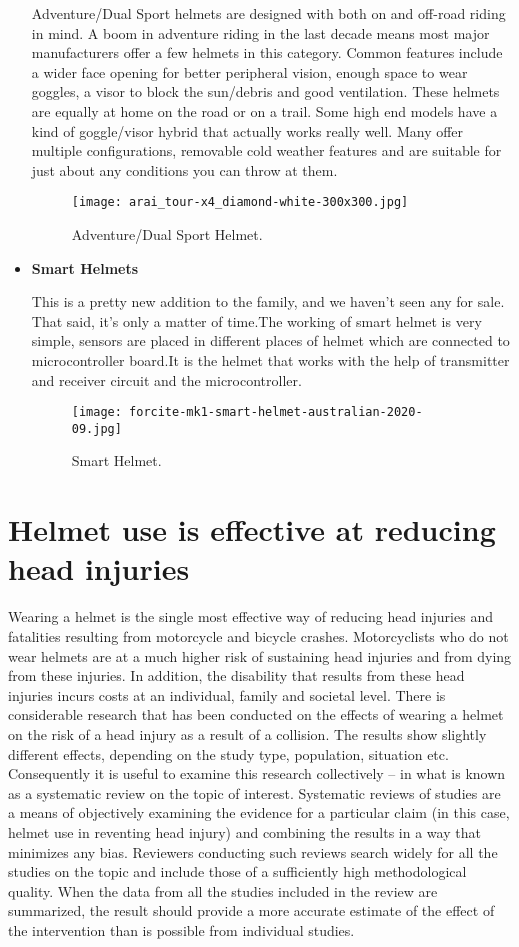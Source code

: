 \begin{itemize}
	Adventure/Dual Sport helmets are designed with both on and off-road riding in mind. A boom in adventure riding in the last decade means most major manufacturers offer a few helmets in this category. Common features include a wider face opening for better peripheral vision, enough space to wear goggles, a visor to block the sun/debris and good ventilation. These helmets are equally at home on the road or on a trail. Some high end models have a kind of goggle/visor hybrid that actually works really well. Many offer multiple configurations, removable cold weather features and are suitable for just about any conditions you can throw at them.
	\begin{figure}[h]
		\centering
		\texttt{[image: arai\_tour-x4\_diamond-white-300x300.jpg]}
		\caption{Adventure/Dual Sport Helmet.}
	\end{figure}
	
	\item\textbf{Smart Helmets} \vspace{.1cm}
	
	This is a pretty new addition to the family, and we haven’t seen any for sale. That said, it’s only a matter of time.The working of smart helmet is very simple, sensors are placed in different places of helmet which are connected to microcontroller board.It is the helmet that works with the help of transmitter and receiver circuit and the microcontroller.
	
	\begin{figure}[h]
		\centering
		\texttt{[image: forcite-mk1-smart-helmet-australian-2020-09.jpg]}
		\caption{Smart Helmet.}
	\end{figure}
\end{itemize} 
\section{Helmet use is effective at reducing head injuries}
Wearing a helmet is the single most effective way of reducing head injuries and fatalities resulting from motorcycle and bicycle crashes. Motorcyclists who do not wear helmets are at a much higher risk of sustaining head injuries and from dying from these injuries. In addition, the disability that results from these head
injuries incurs costs at an individual, family and societal level. There is considerable research that has been conducted on the effects of wearing a helmet on the risk of a head injury as a result of a collision. The results show slightly different effects, depending on the study type, population, situation etc. Consequently it is useful to examine this research collectively – in what is known as a systematic review on the topic of interest. Systematic reviews of studies are a means of objectively examining the evidence for a particular claim (in this case, helmet use in reventing head injury) and combining the results in a way that minimizes any bias. Reviewers conducting such reviews search widely for all the studies on the topic and
include those of a sufficiently high methodological quality. When the data from all the studies included in the review are summarized, the result should provide a more accurate estimate of the effect of the intervention than is possible from individual studies.

